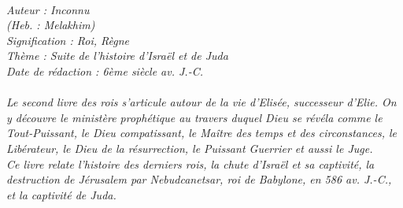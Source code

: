 \BFont
\noindent\hrulefill
{\footnotesize
\textit{
\bigskip
{\centering{}
\\Auteur : Inconnu
\\(Heb. : Melakhim)
\\Signification : Roi, Règne
\\Thème : Suite de l'histoire d'Israël et de Juda
\\Date de rédaction : 6ème siècle av. J.-C.\\}
}
\textit{
\\Le second livre des rois s’articule autour de la vie d’Elisée, successeur d’Elie. On y découvre le ministère prophétique au travers duquel Dieu se révéla comme le Tout-Puissant, le Dieu compatissant, le Maître des temps et des circonstances, le Libérateur, le Dieu de la résurrection, le Puissant Guerrier et aussi le Juge.
\\Ce livre relate l’histoire des derniers rois, la chute d’Israël et sa captivité, la destruction de Jérusalem par Nebudcanetsar, roi de Babylone, en 586 av. J.-C., et la captivité de Juda.\bigskip
}
}
\par\nobreak\noindent\hrulefill
